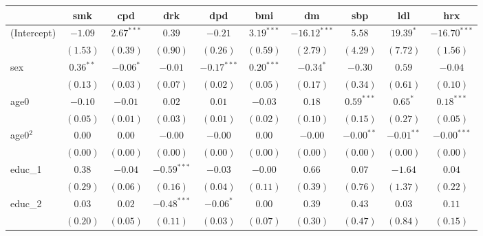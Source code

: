 
\begin{tabular}{l c c c c c c c c c}
\toprule
 & smk & cpd & drk & dpd & bmi & dm & sbp & ldl & hrx \\
\midrule
(Intercept)      & $-1.09$       & $2.67^{***}$  & $0.39$        & $-0.21$       & $3.19^{***}$  & $-16.12^{***}$ & $5.58$        & $19.39^{*}$   & $-16.70^{***}$ \\
                 & $(1.53)$      & $(0.39)$      & $(0.90)$      & $(0.26)$      & $(0.59)$      & $(2.79)$       & $(4.29)$      & $(7.72)$      & $(1.56)$       \\
sex              & $0.36^{**}$   & $-0.06^{*}$   & $-0.01$       & $-0.17^{***}$ & $0.20^{***}$  & $-0.34^{*}$    & $-0.30$       & $0.59$        & $-0.04$        \\
                 & $(0.13)$      & $(0.03)$      & $(0.07)$      & $(0.02)$      & $(0.05)$      & $(0.17)$       & $(0.34)$      & $(0.61)$      & $(0.10)$       \\
age0             & $-0.10$       & $-0.01$       & $0.02$        & $0.01$        & $-0.03$       & $0.18$         & $0.59^{***}$  & $0.65^{*}$    & $0.18^{***}$   \\
                 & $(0.05)$      & $(0.01)$      & $(0.03)$      & $(0.01)$      & $(0.02)$      & $(0.10)$       & $(0.15)$      & $(0.27)$      & $(0.05)$       \\
age0$^2$         & $0.00$        & $0.00$        & $-0.00$       & $-0.00$       & $0.00$        & $-0.00$        & $-0.00^{**}$  & $-0.01^{**}$  & $-0.00^{***}$  \\
                 & $(0.00)$      & $(0.00)$      & $(0.00)$      & $(0.00)$      & $(0.00)$      & $(0.00)$       & $(0.00)$      & $(0.00)$      & $(0.00)$       \\
educ\_1          & $0.38$        & $-0.04$       & $-0.59^{***}$ & $-0.03$       & $-0.00$       & $0.66$         & $0.07$        & $-1.64$       & $0.04$         \\
                 & $(0.29)$      & $(0.06)$      & $(0.16)$      & $(0.04)$      & $(0.11)$      & $(0.39)$       & $(0.76)$      & $(1.37)$      & $(0.22)$       \\
educ\_2          & $0.03$        & $0.02$        & $-0.48^{***}$ & $-0.06^{*}$   & $0.00$        & $0.39$         & $0.43$        & $0.03$        & $0.11$         \\
                 & $(0.20)$      & $(0.05)$      & $(0.11)$      & $(0.03)$      & $(0.07)$      & $(0.30)$       & $(0.47)$      & $(0.84)$      & $(0.15)$       \\

\end{tabular}
